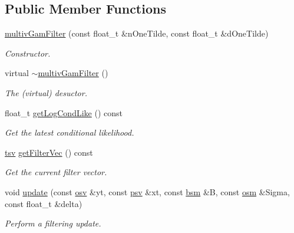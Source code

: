 \subsection*{Public Member Functions}
\begin{DoxyCompactItemize}
\item 
\hyperlink{classmultivGamFilter_a31e576702f6e72f43744d453b2bc6329}{multiv\+Gam\+Filter} (const float\+\_\+t \&n\+One\+Tilde, const float\+\_\+t \&d\+One\+Tilde)
\begin{DoxyCompactList}\small\item\em Constructor. \end{DoxyCompactList}\item 
\mbox{\label{classmultivGamFilter_ad95fbcbba340b6e3e273a9c578bed8e4}} 
virtual \hyperlink{classmultivGamFilter_ad95fbcbba340b6e3e273a9c578bed8e4}{$\sim$multiv\+Gam\+Filter} ()
\begin{DoxyCompactList}\small\item\em The (virtual) desuctor. \end{DoxyCompactList}\item 
float\+\_\+t \hyperlink{classmultivGamFilter_ae32c76dd1096041f358962f93de64a99}{get\+Log\+Cond\+Like} () const
\begin{DoxyCompactList}\small\item\em Get the latest conditional likelihood. \end{DoxyCompactList}\item 
\hyperlink{classmultivGamFilter_a312ca8e7f1344cdeb01fe9e01850aa8e}{tsv} \hyperlink{classmultivGamFilter_aaed17907169b5f14a63dbb7b1ed2e1fa}{get\+Filter\+Vec} () const
\begin{DoxyCompactList}\small\item\em Get the current filter vector. \end{DoxyCompactList}\item 
void \hyperlink{classmultivGamFilter_a9e77dfe0fc57ab01005bc054eca37dfa}{update} (const \hyperlink{classmultivGamFilter_a34e62f4c6f1de388b86e6106f249cef8}{osv} \&yt, const \hyperlink{classmultivGamFilter_a396935d27512187b9109a70ba04c6abf}{psv} \&xt, const \hyperlink{classmultivGamFilter_a48015c1ef68e2d0a704306b56378417d}{bsm} \&B, const \hyperlink{classmultivGamFilter_af55e5c995ab517331ce05dd7ca4f1781}{osm} \&Sigma, const float\+\_\+t \&delta)
\begin{DoxyCompactList}\small\item\em Perform a filtering update. \end{DoxyCompactList}\item 

\end{DoxyCompactItemize}
